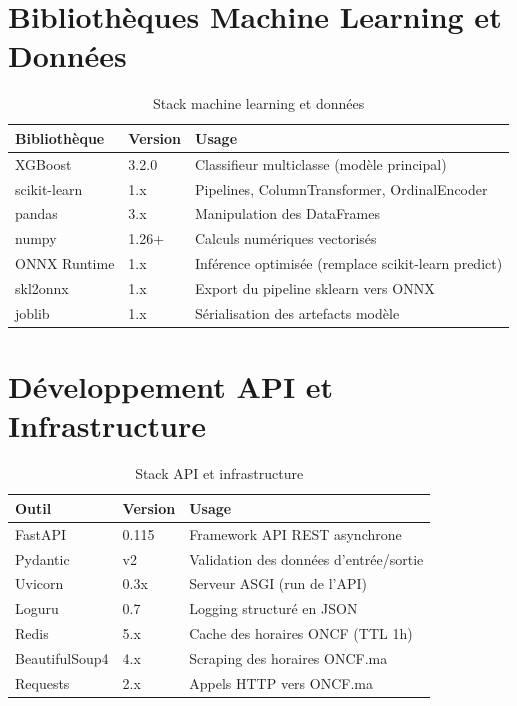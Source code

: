 \documentclass[12pt, a4paper]{report}
\begin{document}

\section{Bibliothèques Machine Learning et Données}

\begin{table}[H]
\centering
\caption{Stack machine learning et données}
\begin{tabularx}{\textwidth}{|l|l|X|}
\hline
\textbf{Bibliothèque} & \textbf{Version} & \textbf{Usage} \\
\hline
XGBoost & 3.2.0 & Classifieur multiclasse (modèle principal) \\
\hline
scikit-learn & 1.x & Pipelines, ColumnTransformer, OrdinalEncoder \\
\hline
pandas & 3.x & Manipulation des DataFrames \\
\hline
numpy & 1.26+ & Calculs numériques vectorisés \\
\hline
ONNX Runtime & 1.x & Inférence optimisée (remplace scikit-learn predict) \\
\hline
skl2onnx & 1.x & Export du pipeline sklearn vers ONNX \\
\hline
joblib & 1.x & Sérialisation des artefacts modèle \\
\hline
\end{tabularx}
\end{table}

\section{Développement API et Infrastructure}

\begin{table}[H]
\centering
\caption{Stack API et infrastructure}
\begin{tabularx}{\textwidth}{|l|l|X|}
\hline
\textbf{Outil} & \textbf{Version} & \textbf{Usage} \\
\hline
FastAPI & 0.115 & Framework API REST asynchrone \\
\hline
Pydantic & v2 & Validation des données d'entrée/sortie \\
\hline
Uvicorn & 0.3x & Serveur ASGI (run de l'API) \\
\hline
Loguru & 0.7 & Logging structuré en JSON \\
\hline
Redis & 5.x & Cache des horaires ONCF (TTL 1h) \\
\hline
BeautifulSoup4 & 4.x & Scraping des horaires ONCF.ma \\
\hline
Requests & 2.x & Appels HTTP vers ONCF.ma \\
\hline
\end{tabularx}
\end{table}
\end{document}
